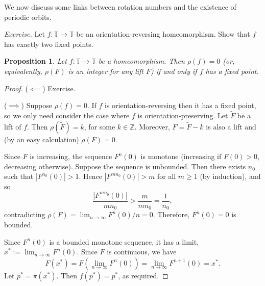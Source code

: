 \documentclass[12pt]{article}
\newtheorem{proposition}[theorem]{Proposition}
\theoremstyle{definition}
\theoremstyle{remark}
\begin{document}
We now discuss some links between rotation numbers and the existence of periodic orbits.

\medskip
\noindent
{\it Exercise.} Let $f : \mathbb T \to \mathbb T$ be an orientation-reversing homeomorphism. Show that
$f$ has exactly two fixed points.



\begin{proposition}
Let $f : \mathbb T \to \mathbb T$ be a homeomorphism. Then $\rho(f)=0$ (or, equivalently, $\rho(F)$ is an integer
for any lift $F$) if and only if $f$ has a fixed point.
\end{proposition}

\begin{proof}
%

\noindent
($\impliedby$) Exercise.

\noindent
($\implies$) Suppose $\rho(f)=0$. 
If $f$ is orientation-reversing then it has a fixed point, so we only need consider the case 
where $f$ is orientation-preserving.
Let $\tilde F$ be a lift of $f$. Then
$\rho(\tilde F) = k$, for some $k \in \mathbb Z$. Moreover, $F = \tilde F-k$ is also a lift and
(by an easy calculation) $\rho(F)=0$.

Since $F$ is increasing, the sequence $F^n(0)$ is monotone (increasing if $F(0)>0$, decreasing otherwise). 
Suppose the sequence is unbounded. Then there exists $n_0$ such that
$|F^{n_0}(0)|>1$. Hence
$|F^{mn_0}(0)|>m$ for all $m \ge 1$ (by induction), and so
\[
\frac{|F^{mn_0}(0)|}{mn_0} > \frac{m}{mn_0} = \frac{1}{n_0},
\]
contradicting $\rho(F) = \lim_{n \to \infty} F^n(0)/n =0$. Therefore,
$F^n(0)=0$ is bounded.

Since $F^n(0)$ is a bounded monotone sequence, it has a limit,
$x^* := \lim_{n \to \infty} F^n(0)$. Since $F$ is continuous, we have
\[
F(x^*) = F\left(\lim_{n \to \infty} F^n(0)\right) = \lim_{n \to \infty} F^{n+1}(0) = x^*.
\]
Let $p^*= \pi(x^*)$. Then $f(p^*) =p^*$, as required.
\end{proof}
\end{document}
